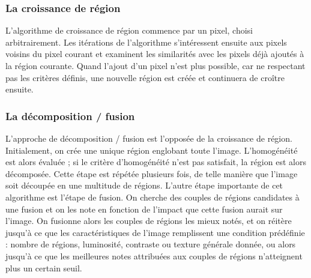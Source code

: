 	\subsubsection{La croissance de région}
		L'algorithme de croissance de région commence par un pixel, choisi arbitrairement. Les itérations de l'algorithme s'intéressent ensuite aux pixels voisins du pixel courant et examinent les similarités avec les pixels déjà ajoutés à la région courante. Quand l'ajout d'un pixel n'est plus possible, car ne respectant pas les critères définis, une nouvelle région est créée et continuera de croître ensuite.
	
	\subsubsection{La décomposition / fusion}
		L'approche de décomposition / fusion est l'opposée de la croissance de région. Initialement, on crée une unique région englobant toute l'image. L'homogénéité est alors évaluée ; si le critère d'homogénéité n'est pas satisfait, la région est alors décomposée. Cette étape est répétée plusieurs fois, de telle manière que l'image soit découpée en une multitude de régions. L'autre étape importante de cet algorithme est l'étape de fusion. On cherche des couples de régions candidates à une fusion et on les note en fonction de l'impact que cette fusion aurait sur l'image. On fusionne alors les couples de régions les mieux notés, et on réitère jusqu’à ce que les caractéristiques de l'image remplissent une condition prédéfinie : nombre de régions, luminosité, contraste ou texture générale donnée, ou alors jusqu’à ce que les meilleures notes attribuées aux couples de régions n'atteignent plus un certain seuil.